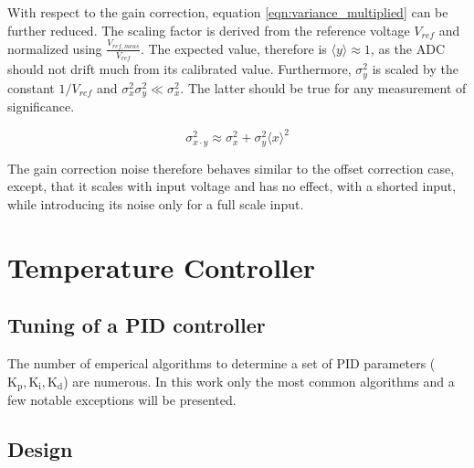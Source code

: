 With respect to the gain correction, equation \ref{eqn:variance_multiplied} can be further reduced. The scaling factor is derived from the reference voltage $V_{ref}$ and normalized using $\frac{V_{ref, meas}}{V_{ref}}$. The expected value, therefore is $\langle y \rangle \approx 1$, as the ADC should not drift much from its calibrated value. Furthermore, $\sigma_y^2$ is scaled by the constant $1/V_{ref}$ and $\sigma_x^2 \sigma_y^2 \ll \sigma_x^2$. The latter should be true for any measurement of significance.

\begin{equation}
    \sigma_{x \cdot y}^2 \approx \sigma_x^2 + \sigma_y^2 \langle x \rangle^2
\end{equation}

The gain correction noise therefore behaves similar to the offset correction case, except, that it scales with input voltage and has no effect, with a shorted input, while introducing its noise only for a full scale input.



\clearpage
\section{Temperature Controller}


\subsection{Tuning of a PID controller}
The number of emperical algorithms to determine a set of PID parameters ($\mathrm{K_p, K_i, K_d}$) are numerous. In this work only the most common algorithms and a few notable exceptions will be presented.
\subsection{Design}
